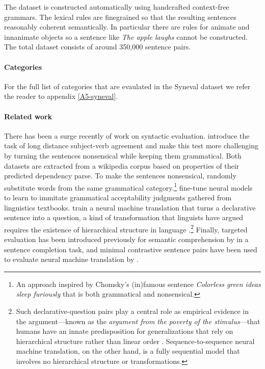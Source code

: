 The dataset is constructed automatically using handcrafted context-free grammars. The lexical rules are finegrained so that the resulting sentences reasonably coherent semantically. In particular there are rules for animate and innanimate objects so a sentence like \textit{The apple laughs} cannot be constructed. The total dataset consists of around 350,000 sentence pairs.

\paragraph{Categories} For the full list of categories that are evaulated in the Syneval dataset we refer the reader to appendix \ref{A5-syneval}.

\paragraph{Related work} There has been a surge recently of work on syntactic evaluation. \citet{linzen2016syntax} introduce the task of long distance subject-verb agreement and \citet{gulordava2018colorless} make this test more challenging by turning the sentences nonsensical while keeping them grammatical. Both datasets are extracted from a wikipedia corpus based on properties of their predicted dependency parse. To make the sentences nonsensical, \citet{gulordava2018colorless} randomly substitute words from the same grammatical category.\footnote{An approach inspired by Chomsky's (in)famous sentence \textit{Colorless green ideas sleep furiously} that is both grammatical and nonsensical.} \citet{warstadt2018acceptability} fine-tune neural models to learn to immitate grammatical acceptability judgments gathered from linguistics textbooks.
\citet{mccoy2018revisiting} train a neural machine translation that turns a declarative sentence into a question, a kind of transformation that linguists have argued requires the existence of hierarchical structure in language \citep{everaert2015structures}.\footnote{Such declarative-question pairs play a central role as empirical evidence in the argument---known as the \textit{argument from the poverty of the stimulus}---that humans have an innate predisposition for generalizations that rely on hierarchical structure rather than linear order \citep{chomsky1980rules}. Sequence-to-sequence neural machine translation, on the other hand, is a fully sequential model that involves no hierarchical structure or transformations.} Finally, targeted evaluation has been introduced previously for semantic comprehension by \citet{zweig2011microsoft} in a sentence completion task, and minimal contrastive sentence pairs have been used to evaluate neural machine translation by \citet{sennrich2017grammatical}.


